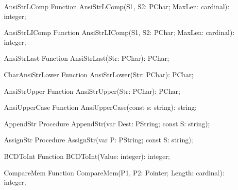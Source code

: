  
\begin{function}{AnsiStrLComp}
\Declaration
Function AnsiStrLComp(S1, S2: PChar; MaxLen: cardinal): integer;
\Description
\Errors
\SeeAlso
\end{function}

 
\begin{function}{AnsiStrLIComp}
\Declaration
Function AnsiStrLIComp(S1, S2: PChar; MaxLen: cardinal): integer;
\Description
\Errors
\SeeAlso
\end{function}

 
\begin{function}{AnsiStrLast}
\Declaration
Function AnsiStrLast(Str: PChar): PChar;
\Description
\Errors
\SeeAlso
\end{function}

 
\begin{function}{CharAnsiStrLower}
\Declaration
Function AnsiStrLower(Str: PChar): PChar;
\Description
\Errors
\SeeAlso
\end{function}

 
\begin{function}{AnsiStrUpper}
\Declaration
Function AnsiStrUpper(Str: PChar): PChar;
\Description
\Errors
\SeeAlso
\end{function}

 
\begin{function}{AnsiUpperCase}
\Declaration
Function AnsiUpperCase(const s: string): string;
\Description
\Errors
\SeeAlso
\end{function}

 
\begin{procedure}{AppendStr}
\Declaration
Procedure AppendStr(var Dest: PString; const S: string);
\Description
\Errors
\SeeAlso
\end{procedure}

 
\begin{procedure}{AssignStr}
\Declaration
Procedure AssignStr(var P: PString; const S: string);
\Description
\Errors
\SeeAlso
\end{procedure}

 
\begin{function}{BCDToInt}
\Declaration
Function BCDToInt(Value: integer): integer;
\Description
\Errors
\SeeAlso
\end{function}

 
\begin{function}{CompareMem}
\Declaration
Function CompareMem(P1, P2: Pointer; Length: cardinal): integer;
\Description
\Errors
\SeeAlso
\end{function}

